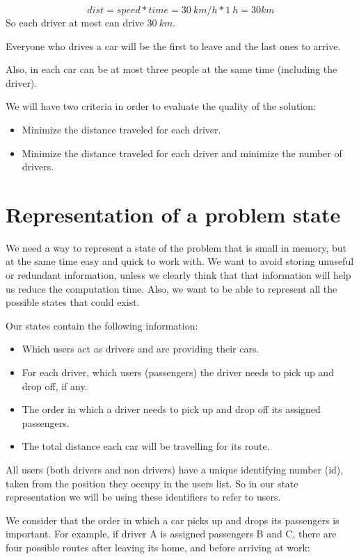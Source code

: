 \documentclass[12]{article}
\begin{document}
$$ dist = speed * time = 30\ km/h * 1\ h = 30 km $$
So each driver at most can drive $30\ km$.

Everyone who drives a car will be the first to leave and the last ones to arrive.

Also, in each car can be at most three people at the same time (including the driver).

We will have two criteria in order to evaluate the quality of the solution:
\begin{itemize}
  \item Minimize the distance traveled for each driver.
  \item Minimize the distance traveled for each driver and minimize the number of drivers.
\end{itemize} 
 
\section{Representation of a problem state}
We need a way to represent a state of the problem that is small in memory, but at the same time easy and quick to work with.
We want to avoid storing unuseful or redundant information, unless we clearly think that that information will help us reduce the computation time. Also, we want to be able to represent all the possible states that could exist.

Our states contain the following information:

\begin{itemize}
	\item Which users act as drivers and are providing their cars.
	\item For each driver, which users (passengers) the driver needs to pick up and drop off, if any.
	\item The order in which a driver needs to pick up and drop off its assigned passengers.
	\item The total distance each car will be travelling for its route.
\end{itemize}

All users (both drivers and non drivers) have a unique identifying number (id), taken from the position they occupy in the users list.
So in our state representation we will be using these identifiers to refer to users.

We consider that the order in which a car picks up and drops its passengers is important. For example, if driver A is assigned passengers B and C, there are four possible routes after leaving its home, and before arriving at work:
\end{document}
